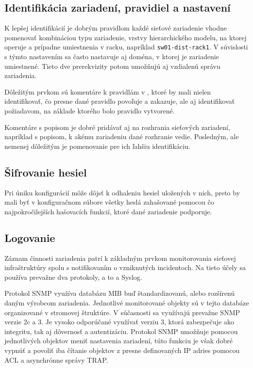\subsection*{Identifikácia zariadení, pravidiel a nastavení}
K lepšej identifikácií je dobrým pravidlom každé sieťové zariadenie vhodne pomenovať kombináciou typu zariadenie, vrstvy hierarchického modelu, na ktorej operuje a prípadne umiestnenia v racku, napríklad \texttt{sw01-dist-rack1}. V súvislosti s týmto nastavením sa často nastavuje aj doména, v ktorej je zariadenie umiestnené. Tieto dve prerekvizity potom umožňujú aj vzdialenú správu zariadenia.

Dôležitým prvkom sú komentáre k pravidlám v , ktoré by mali nielen identifikovať, čo presne dané pravidlo povoľuje a zakazuje, ale aj identifikovať požiadavom, na základe ktorého bolo pravidlo vytvorené. 

Komentáre s popisom je dobré pridávať aj na rozhrania sieťových zariadení, napríklad s popisom, k akému zariadeniu dané rozhranie vedie. Posledným, ale nemenej dôležitým je pomenovanie  pre ich ľahšiu identifikáciu.

\subsection*{Šifrovanie hesiel}
Pri úniku konfigurácií môže dôjsť k odhaleniu hesiel uložených v nich, preto by mali byť v konfiguračnom súbore všetky heslá zahašované pomocou čo najpokročilejších hašovacích funkcií, ktoré dané zariadenie podporuje.

\subsection*{Logovanie}
Záznam činnosti zariadenia patrí k základným prvkom monitorovania sieťovej infraštruktúry spolu s notifikovaním o vzniknutých incidentoch. Na tieto účely sa používa prevažne dva protokoly, a to  a Syslog. 

Protokol SNMP využíva databázu MIB buď štandardizovanú, alebo rozšírenú daným výrobcom zariadenia. Jednotlivé monitorované objekty sú v tejto databáze organizované v stromovej štruktúre. V súčasnosti sa využívajú prevažne SNMP verzie 2c a 3. Je vysoko odporúčané využívať verziu 3, ktorá zabezpečuje ako integritu, tak aj dôvernosť a autentizáciu. Protokol SNMP umožňuje pomocou jednotlivých objektov meniť nastavenia zariadení, túto funkciu je však dobré vypnúť a povoliť iba čítanie objektov z presne definovaných IP adries pomocou ACL a asynchrónne správy TRAP.   

